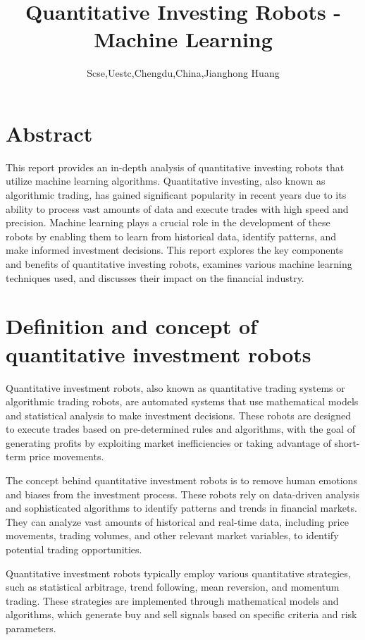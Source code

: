 \documentclass[UTF8]{ctexart}
\title{Quantitative Investing Robots - Machine Learning}
\author{Scse,Uestc,Chengdu,China,Jianghong Huang}
\begin{document}
\maketitle

\section*{Abstract}
This report provides an in-depth analysis of quantitative investing robots that utilize machine learning algorithms. Quantitative investing, also known as algorithmic trading, has gained significant popularity in recent years due to its ability to process vast amounts of data and execute trades with high speed and precision. Machine learning plays a crucial role in the development of these robots by enabling them to learn from historical data, identify patterns, and make informed investment decisions. This report explores the key components and benefits of quantitative investing robots, examines various machine learning techniques used, and discusses their impact on the financial industry.

\section{Definition and concept of quantitative investment robots}
Quantitative investment robots, also known as quantitative trading systems or algorithmic trading robots, are automated systems that use mathematical models and statistical analysis to make investment decisions. These robots are designed to execute trades based on pre-determined rules and algorithms, with the goal of generating profits by exploiting market inefficiencies or taking advantage of short-term price movements.

The concept behind quantitative investment robots is to remove human emotions and biases from the investment process. These robots rely on data-driven analysis and sophisticated algorithms to identify patterns and trends in financial markets. They can analyze vast amounts of historical and real-time data, including price movements, trading volumes, and other relevant market variables, to identify potential trading opportunities.

Quantitative investment robots typically employ various quantitative strategies, such as statistical arbitrage, trend following, mean reversion, and momentum trading. These strategies are implemented through mathematical models and algorithms, which generate buy and sell signals based on specific criteria and risk parameters.
\end{document}
